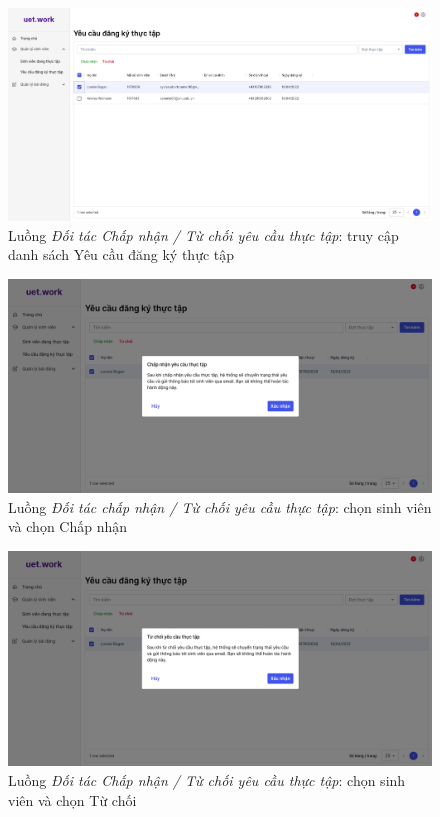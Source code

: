 \documentclass[./../main.tex]{subfiles}
\begin{document}
\begin{figure}[]
	\includegraphics[width=\linewidth]{./images/image29.png}
	\caption{Luồng \emph{Đối tác Chấp nhận / Từ chối yêu cầu thực tập}: truy cập danh sách Yêu cầu đăng ký thực tập}
	\label{fig:partner_list_requests_page}
\end{figure}

\begin{figure}[]
	\includegraphics[width=\linewidth]{./images/image66.png}
	\caption{Luồng \emph{Đối tác chấp nhận / Từ chối yêu cầu thực tập}: chọn sinh viên và chọn Chấp nhận}
	\label{fig:partner_select_students_approve}
\end{figure}

\begin{figure}[]
	\includegraphics[width=\linewidth]{./images/image67.png}
	\caption{Luồng \emph{Đối tác Chấp nhận / Từ chối yêu cầu thực tập}: chọn sinh viên và chọn Từ chối}
	\label{fig:partner_select_students_reject}
\end{figure}
\end{document}
